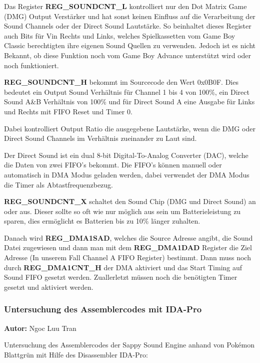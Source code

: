 \documentclass[11pt,a4paper]{scrartcl}
\newcommand{\AutorNgoc} {
    \vspace{-4mm}
    \large \textbf{Autor:} Ngoc Luu Tran \normalsize
    \vspace{2mm}
}
\begin{document}
Das Register \textbf{REG\_SOUNDCNT\_L} kontrolliert nur den Dot Matrix Game (DMG) Output Verst\"{a}rker und hat sonst keinen Einfluss auf die Verarbeitung der Sound Channels oder der Direct Sound Lautst\"{a}rke. So beinhaltet dieses Register auch Bits f\"{u}r Vin Rechts und Links, welches Spielkassetten vom Game Boy Classic berechtigten ihre eigenen Sound Quellen zu verwenden. Jedoch ist es nicht Bekannt, ob diese Funktion noch vom Game Boy Advance unterst\"{u}tzt wird oder noch funktioniert.


\textbf{REG\_SOUNDCNT\_H} bekommt im Sourcecode den Wert 0x0B0F. Dies bedeutet ein Output Sound Verh\"{a}ltnis f\"{u}r Channel 1 bis 4 von 100\%, ein Direct Sound A\&B Verh\"{a}ltnis von 100\% und f\"{u}r Direct Sound A eine Ausgabe f\"{u}r Links und Rechts mit FIFO Reset und Timer 0.

Dabei kontrolliert Output Ratio die ausgegebene Lautst\"{a}rke, wenn die DMG oder Direct Sound Channels im Verh\"{a}ltnis zueinander zu Laut sind.

Der Direct Sound ist ein dual 8-bit Digital-To-Analog Converter (DAC), welche die Daten von zwei FIFO's bekommt. Die FIFO's k\"{o}nnen manuell oder automatisch in DMA Modus geladen werden, dabei verwendet der DMA Modus die Timer als Abtastfrequenzbezug.


\textbf{REG\_SOUNDCNT\_X} schaltet den Sound Chip (DMG und Direct Sound) an oder aus. Dieser sollte so oft wie nur m\"{o}glich aus sein um Batterieleistung zu sparen, dies erm\"{o}glicht es Batterien bis zu 10\% l\"{a}nger zuhalten. 


Danach wird \textbf{REG\_DMA1SAD}, welches die Source Adresse angibt, die Sound Datei zugewiesen und dann man mit dem \textbf{REG\_DMA1DAD} Register die Ziel Adresse (In unserem Fall Channel A FIFO Register) bestimmt. Dann muss noch durch \textbf{REG\_DMA1CNT\_H} der DMA aktiviert und das Start Timing auf Sound FIFO gesetzt werden. Zuallerletzt m\"{u}ssen noch die ben\"{o}tigten Timer gesetzt und aktiviert werden.


\newpage

\subsubsection{Untersuchung des Assemblercodes mit IDA-Pro} \label{Assemblercode}
\AutorNgoc

Untersuchung des Assemblercodes der Sappy Sound Engine anhand von Pok\'{e}mon Blattgr\"{u}n mit Hilfe des Disassembler IDA-Pro:
\end{document}
